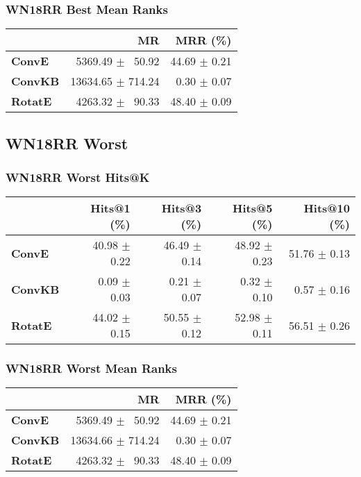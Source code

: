 \documentclass{article}
\begin{document}
\subsubsection{WN18RR Best Mean Ranks}
    \begin{center}
    \begin{tabular}{lrr}
\toprule
{} &                 MR &      MRR (\%) \\
\midrule
\textbf{ConvE } &  $\phantom{5}$5369.49 $\pm$ $\phantom{5}$50.92 &  44.69 $\pm$ 0.21 \\
\textbf{ConvKB} &  13634.65 $\pm$ 714.24 &  $\phantom{5}$0.30 $\pm$ 0.07 \\
\textbf{RotatE} &  $\phantom{5}$4263.32 $\pm$ $\phantom{5}$90.33 &  48.40 $\pm$ 0.09 \\
\bottomrule
\end{tabular}

    \end{center}
\subsection{WN18RR Worst}
\subsubsection{WN18RR Worst Hits@K}
    \begin{center}
    \begin{tabular}{lrrrr}
\toprule
{} &   Hits@1 (\%) &   Hits@3 (\%) &   Hits@5 (\%) &  Hits@10 (\%) \\
\midrule
\textbf{ConvE } &  40.98 $\pm$ 0.22 &  46.49 $\pm$ 0.14 &  48.92 $\pm$ 0.23 &  51.76 $\pm$ 0.13 \\
\textbf{ConvKB} &  $\phantom{5}$0.09 $\pm$ 0.03 &  $\phantom{5}$0.21 $\pm$ 0.07 &  $\phantom{5}$0.32 $\pm$ 0.10 &  $\phantom{5}$0.57 $\pm$ 0.16 \\
\textbf{RotatE} &  44.02 $\pm$ 0.15 &  50.55 $\pm$ 0.12 &  52.98 $\pm$ 0.11 &  56.51 $\pm$ 0.26 \\
\bottomrule
\end{tabular}

    \end{center}
\subsubsection{WN18RR Worst Mean Ranks}
    \begin{center}
    \begin{tabular}{lrr}
\toprule
{} &                 MR &      MRR (\%) \\
\midrule
\textbf{ConvE } &  $\phantom{5}$5369.49 $\pm$ $\phantom{5}$50.92 &  44.69 $\pm$ 0.21 \\
\textbf{ConvKB} &  13634.66 $\pm$ 714.24 &  $\phantom{5}$0.30 $\pm$ 0.07 \\
\textbf{RotatE} &  $\phantom{5}$4263.32 $\pm$ $\phantom{5}$90.33 &  48.40 $\pm$ 0.09 \\
\bottomrule
\end{tabular}

    \end{center}
\end{document}
